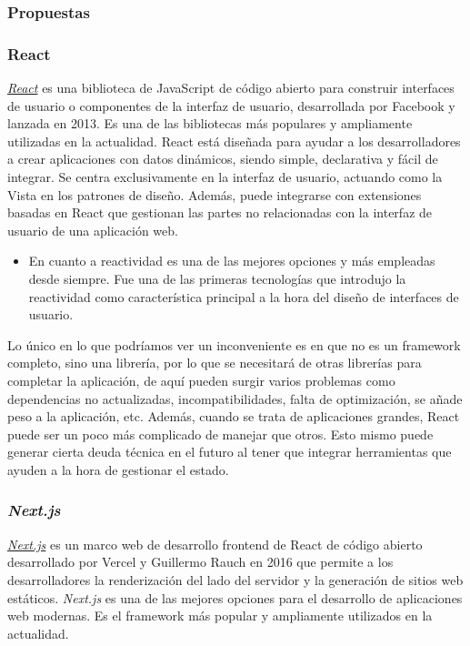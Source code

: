 \subsubsection{Propuestas}

\subsubsection{React}

\href{https://react.dev/}{\textit{React}} es una biblioteca de JavaScript de código abierto para construir interfaces de usuario o componentes de la interfaz de usuario, desarrollada por Facebook y lanzada en 2013. Es una de las bibliotecas más populares y ampliamente utilizadas en la actualidad. React está diseñada para ayudar a los desarrolladores a crear aplicaciones con datos dinámicos, siendo simple, declarativa y fácil de integrar. Se centra exclusivamente en la interfaz de usuario, actuando como la Vista en los patrones de diseño. Además, puede integrarse con extensiones basadas en React que gestionan las partes no relacionadas con la interfaz de usuario de una aplicación web.

\begin{itemize}
    \item[\bien] En cuanto a reactividad es una de las mejores opciones y más empleadas desde siempre. Fue una de las primeras tecnologías que introdujo la reactividad como característica principal a la hora del diseño de interfaces de usuario.
\end{itemize}

Lo único en lo que podríamos ver un inconveniente es en que no es un framework completo, sino una librería, por lo que se necesitará de otras librerías para completar la aplicación, de aquí pueden surgir varios problemas como dependencias no actualizadas, incompatibilidades, falta de optimización, se añade peso a la aplicación, etc. Además, cuando se trata de aplicaciones grandes, React puede ser un poco más complicado de manejar que otros. Esto mismo puede generar cierta deuda técnica en el futuro al tener que integrar herramientas que ayuden a la hora de gestionar el estado.

\subsubsection{\textit{Next.js}}

\href{https://nextjs.org/}{\textit{Next.js}} es un marco web de desarrollo frontend de React de código abierto desarrollado por Vercel y Guillermo Rauch en 2016 que permite a los desarrolladores la renderización del lado del servidor y la generación de sitios web estáticos. \textit{Next.js} es una de las mejores opciones para el desarrollo de aplicaciones web modernas. Es el framework más popular y ampliamente utilizados en la actualidad.

